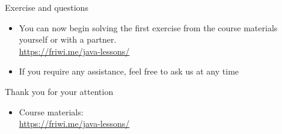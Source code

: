 \begin{frame}[fragile]{Exercise and questions}
    \begin{itemize}
    \item You can now begin solving the first exercise from the course materials yourself or with a partner. \\
        \url{https://friwi.me/java-lessons/}
    \item If you require any assistance, feel free to ask us at any time
    \end{itemize}
\end{frame}

\begin{frame}[fragile]{Thank you for your attention}
    \begin{itemize}
    \item Course materials: \\
        \url{https://friwi.me/java-lessons/}
    \end{itemize}
\end{frame}



